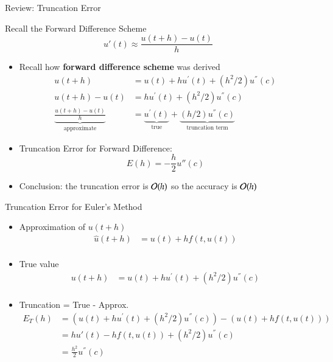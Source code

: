 \documentclass[10pt]{beamer}
\begin{document}
\begin{frame}{Review: Truncation Error}
\begin{block}{Recall the Forward Difference Scheme}
    $$u'(t) \approx \frac{u(t+h) - u(t)}{h}$$
\end{block}
\begin{itemize}
    \item Recall how \textbf{forward difference scheme} was derived 
    \begin{align*}
         u(t+h) &= u(t) + h u^\prime(t) + (h^2/2) u^{''}(c) \\
         u(t+h) - u(t)&=  hu^\prime(t) + (h^2/2) u^{''}(c) \\
         \underbrace{\frac{u(t+h) - u(t)}{h}}_{\text{approximate}}&=  \underbrace{u^\prime(t)}_{\text{true}} + \underbrace{(h/2) u^{''}(c)}_{\text{truncation term}} 
    \end{align*}
    \item Truncation Error for Forward Difference: 
        $$ E(h) = -\frac{h}{2} u''(c)$$
    \item Conclusion: the truncation error is ${\mathcal{O}}(h)$ so the accuracy is ${\mathcal{O}}(h)$

\end{itemize}
\end{frame}
\begin{frame}{Truncation Error for Euler's Method}
\begin{itemize}
    \item Approximation of $u(t+h)$
    \begin{align*}
         \widehat{u}(t+h) &= u(t) + h f(t,u(t)) \\
    \end{align*}
    \item True value 
    \begin{align*}
         u(t+h) &= u(t) + h u^\prime(t) + (h^2/2) u^{''}(c) \\
    \end{align*}
    \item Truncation = True - Approx. 
    \begin{align*}
        E_T(h) &=  \left(u(t) + h u^\prime(t) + (h^2/2) u^{''}(c)\right) -  \left(u(t) + h f(t,u(t))\right)\\
               &= h u'(t) - h f(t,u(t)) + (h^2/2) u^{''}(c)\\
               &= \frac{h^2}{2} u^{''}(c)
    \end{align*}
\end{itemize}
\end{frame}
\end{document}
